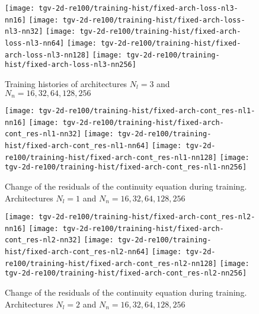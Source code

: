 \begin{figure}[H]
    \centering
    \texttt{[image: tgv-2d-re100/training-hist/fixed-arch-loss-nl3-nn16]}%
    \hfill
    \texttt{[image: tgv-2d-re100/training-hist/fixed-arch-loss-nl3-nn32]}%
    \newline
    \texttt{[image: tgv-2d-re100/training-hist/fixed-arch-loss-nl3-nn64]}%
    \hfill
    \texttt{[image: tgv-2d-re100/training-hist/fixed-arch-loss-nl3-nn128]}%
    \newline
    \texttt{[image: tgv-2d-re100/training-hist/fixed-arch-loss-nl3-nn256]}%
    \caption{Training histories of architectures $N_l=3$ and $N_n=16,32,64,128,256$}
\end{figure}

\begin{figure}[H]
    \centering
    \texttt{[image: tgv-2d-re100/training-hist/fixed-arch-cont\_res-nl1-nn16]}%
    \hfill
    \texttt{[image: tgv-2d-re100/training-hist/fixed-arch-cont\_res-nl1-nn32]}%
    \newline
    \texttt{[image: tgv-2d-re100/training-hist/fixed-arch-cont\_res-nl1-nn64]}%
    \hfill
    \texttt{[image: tgv-2d-re100/training-hist/fixed-arch-cont\_res-nl1-nn128]}%
    \newline
    \texttt{[image: tgv-2d-re100/training-hist/fixed-arch-cont\_res-nl1-nn256]}%
    \caption{Change of the residuals of the continuity equation during training. Architectures $N_l=1$ and $N_n=16,32,64,128,256$}
\end{figure}

\begin{figure}[H]
    \centering
    \texttt{[image: tgv-2d-re100/training-hist/fixed-arch-cont\_res-nl2-nn16]}%
    \hfill
    \texttt{[image: tgv-2d-re100/training-hist/fixed-arch-cont\_res-nl2-nn32]}%
    \newline
    \texttt{[image: tgv-2d-re100/training-hist/fixed-arch-cont\_res-nl2-nn64]}%
    \hfill
    \texttt{[image: tgv-2d-re100/training-hist/fixed-arch-cont\_res-nl2-nn128]}%
    \newline
    \texttt{[image: tgv-2d-re100/training-hist/fixed-arch-cont\_res-nl2-nn256]}%
    \caption{Change of the residuals of the continuity equation during training. Architectures $N_l=2$ and $N_n=16,32,64,128,256$}
\end{figure}


